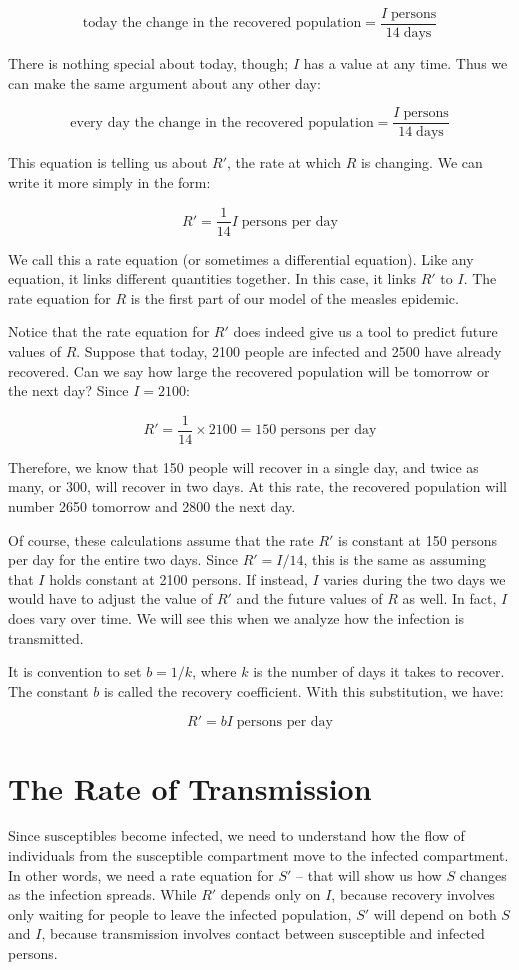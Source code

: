 \documentclass
[justified,nohyper]
{tufte-handout}
\begin{document}
\[
	\text{today the change in the recovered population} = \dfrac{I\;\text{persons}}{14\;\text{days}}
\]

There is nothing special about today, though; $I$ has a value at any time. Thus we can make the same argument about any other day:

\[
	\text{every day the change in the recovered population} = \dfrac{I\;\text{persons}}{14\;\text{days}}
\]

This equation is telling us about $R'$, the rate at which $R$ is changing. We can write it more simply in the form:

\[
	R' = \dfrac{1}{14}I \; \text{persons per day}
\]

We call this a rate equation (or sometimes a differential equation). Like any equation, it links different quantities together. In this case, it links $R'$ to $I$. The rate equation for $R$ is the first part of our model of the measles epidemic.

Notice that the rate equation for $R'$ does indeed give us a tool to predict future values of $R$. Suppose that today, 2100 people are infected and 2500 have already recovered. Can we say how large the recovered population will be tomorrow or the next day? Since $I=2100$:

\[
	R' = \dfrac{1}{14} \times 2100 = 150\;\text{persons per day}
\]

Therefore, we know that 150 people will recover in a single day, and twice as many, or 300, will recover in two days. At this rate, the recovered population will number 2650 tomorrow and 2800 the next day.

Of course, these calculations assume that the rate $R'$ is constant at 150 persons per day for the entire two days. Since $R'=I/14$, this is the same as assuming that $I$ holds constant at 2100 persons. If instead, $I$ varies during the two days we would have to adjust the value of $R'$ and the future values of $R$ as well. In fact, $I$ does vary over time. We will see this when we analyze how the infection is transmitted.

It is convention to set $b=1/k$, where $k$ is the number of days it takes to recover. The constant $b$ is called the recovery coefficient. With this substitution, we have:

\[
	R' = bI\;\text{persons per day}
\]

\section{The Rate of Transmission}
Since susceptibles become infected, we need to understand how the flow of individuals from the susceptible compartment move to the infected compartment. In other words, we need a rate equation for $S'$ -- that will show us how $S$ changes as the infection spreads. While $R'$ depends only on $I$, because recovery involves only waiting for people to leave the infected population, $S'$ will depend on both $S$ and $I$, because transmission involves contact between susceptible and infected persons.
\end{document}
